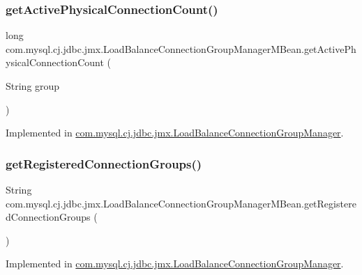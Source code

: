 \subsubsection{\texorpdfstring{get\+Active\+Physical\+Connection\+Count()}{getActivePhysicalConnectionCount()}}
{\footnotesize\ttfamily long com.\+mysql.\+cj.\+jdbc.\+jmx.\+Load\+Balance\+Connection\+Group\+Manager\+M\+Bean.\+get\+Active\+Physical\+Connection\+Count (\begin{DoxyParamCaption}\item[{String}]{group }\end{DoxyParamCaption})}



Implemented in \mbox{\hyperlink{classcom_1_1mysql_1_1cj_1_1jdbc_1_1jmx_1_1_load_balance_connection_group_manager_a386e3fbaa0dad1f3b0ca889a51bb8c4f}{com.\+mysql.\+cj.\+jdbc.\+jmx.\+Load\+Balance\+Connection\+Group\+Manager}}.

\mbox{\label{interfacecom_1_1mysql_1_1cj_1_1jdbc_1_1jmx_1_1_load_balance_connection_group_manager_m_bean_a9eff7e6cc2a298da10fd288d695ae89e}} 
\subsubsection{\texorpdfstring{get\+Registered\+Connection\+Groups()}{getRegisteredConnectionGroups()}}
{\footnotesize\ttfamily String com.\+mysql.\+cj.\+jdbc.\+jmx.\+Load\+Balance\+Connection\+Group\+Manager\+M\+Bean.\+get\+Registered\+Connection\+Groups (\begin{DoxyParamCaption}{ }\end{DoxyParamCaption})}



Implemented in \mbox{\hyperlink{classcom_1_1mysql_1_1cj_1_1jdbc_1_1jmx_1_1_load_balance_connection_group_manager_ae388805fdc8aa6608edbf4f7d8e1c649}{com.\+mysql.\+cj.\+jdbc.\+jmx.\+Load\+Balance\+Connection\+Group\+Manager}}.

